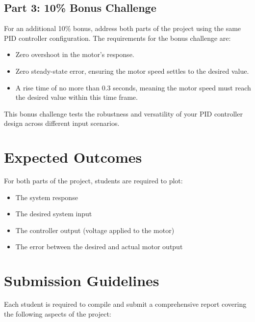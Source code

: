 \documentclass[11pt]{article}
\begin{document}
\subsection{Part 3: 10\% Bonus Challenge}
For an additional 10\% bonus, address both parts of the project using the same PID controller configuration. The requirements for the bonus challenge are:
\begin{itemize}
    \item Zero overshoot in the motor's response.
    \item Zero steady-state error, ensuring the motor speed settles to the desired value.
    \item A rise time of no more than 0.3 seconds, meaning the motor speed must reach the desired value within this time frame.
\end{itemize}
This bonus challenge tests the robustness and versatility of your PID controller design across different input scenarios.


\section{Expected Outcomes}
For both parts of the project, students are required to plot:
\begin{itemize}
    \item The system response
    \item The desired system input
    \item The controller output (voltage applied to the motor)
    \item The error between the desired and actual motor output
\end{itemize}

\section{Submission Guidelines}
Each student is required to compile and submit a comprehensive report covering the following aspects of the project:
\end{document}
